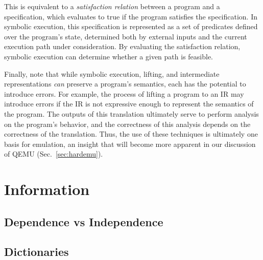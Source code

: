 This is equivalent to a \emph{satisfaction relation} between a program and a specification, which evaluates to true if the program satisfies the specification.
In symbolic execution, this specification is represented as a set of predicates defined over the program's state, determined both by external inputs and the current execution path under consideration.
By evaluating the satisfaction relation, symbolic execution can determine whether a given path is feasible.

Finally, note that while symbolic execution, lifting, and intermediate representations \emph{can} preserve a program's semantics, each has the potential to introduce errors.
For example, the process of lifting a program to an IR may introduce errors if the IR is not expressive enough to represent the semantics of the program.
The outputs of this translation ultimately serve to perform analysis on the program's behavior, and the correctness of this analysis depends on the correctness of the translation.
Thus, the use of these techniques is ultimately one basis for emulation, an insight that will become more apparent in our discussion of QEMU (Sec.~\ref{sec:hardemu}).

\section{Information}

\subsection{Dependence vs Independence}

\subsection{Dictionaries}

